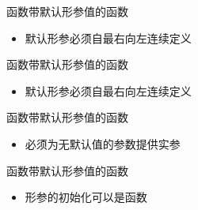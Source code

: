 \begin{frame}[fragile]{函数}{带默认形参值的函数}
  \begin{itemize}
  \item 默认形参必须\alert{自最右向左连续}定义
  \end{itemize}
  \begin{center}
    \begin{minipage}{0.9\linewidth}
    \end{minipage}
  \end{center}
\end{frame}

\begin{frame}[fragile]{函数}{带默认形参值的函数}
  \begin{itemize}
  \item 默认形参必须\alert{自最右向左连续}定义
  \end{itemize}
  \begin{center}
    \begin{minipage}{0.9\linewidth}
    \end{minipage}
  \end{center}
\end{frame}

\begin{frame}[fragile]{函数}{带默认形参值的函数}
  \begin{itemize}
  \item 必须为无默认值的参数提供实参
  \end{itemize}
  \begin{center}
    \begin{minipage}{0.9\linewidth}
    \end{minipage}
  \end{center}
\end{frame}

\begin{frame}[fragile]{函数}{带默认形参值的函数}
  \begin{itemize}
  \item 形参的初始化可以是函数
  \end{itemize}
  \begin{center}
    \begin{minipage}{0.9\linewidth}
    \end{minipage}
  \end{center}
\end{frame}
